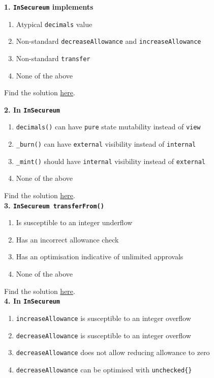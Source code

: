 \vfill

\textbf{1. \texttt{InSecureum} implements}

\begin{enumerate}[label=\Alph*.]
    \item Atypical \verb|decimals| value
    \item Non-standard \verb|decreaseAllowance| and \verb|increaseAllowance|
    \item Non-standard \verb|transfer|
    \item None of the above
\end{enumerate}

Find the solution \hyperref[sec:race4_q1]{here}.\\

\pagebreak

\textbf{2. In \texttt{InSecureum}}

\begin{enumerate}[label=\Alph*.]
    \item\verb|decimals()| can have \verb|pure| state mutability instead of \verb|view|
    \item\verb|_burn()| can have \verb|external| visibility instead of \verb|internal|
    \item\verb|_mint()| should have \verb|internal| visibility instead of \verb|external|
    \item None of the above
\end{enumerate}

Find the solution \hyperref[sec:race4_q2]{here}.\\

\textbf{3. \texttt{InSecureum transferFrom()}}

\begin{enumerate}[label=\Alph*.]
    \item Is susceptible to an integer underflow
    \item Has an incorrect allowance check
    \item Has an optimisation indicative of unlimited approvals
    \item None of the above
\end{enumerate}

Find the solution \hyperref[sec:race4_q3]{here}.\\

\textbf{4. In \texttt{InSecureum}}

\begin{enumerate}[label=\Alph*.]
    \item\verb|increaseAllowance| is susceptible to an integer overflow
    \item\verb|decreaseAllowance| is susceptible to an integer overflow
    \item\verb|decreaseAllowance| does not allow reducing allowance to zero
    \item\verb|decreaseAllowance| can be optimised with \verb|unchecked{}|
\end{enumerate}

